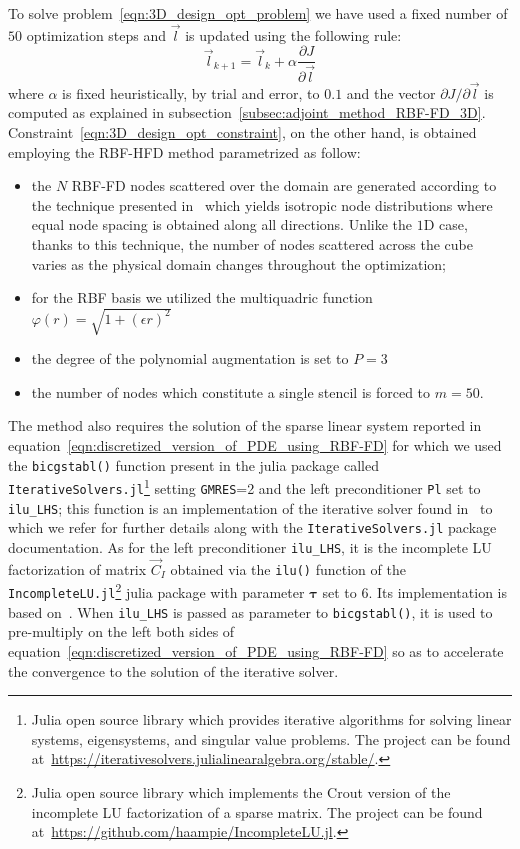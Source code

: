 \medskip
To solve problem~\eqref{eqn:3D_design_opt_problem} we have used a fixed number of $50$ optimization steps and $\vec{l}$ is updated using the following rule:
\begin{equation}
	\vec{l}_{k+1} = \vec{l}_k + \alpha \frac{\partial J}{\partial \vec{l}}
\end{equation}
where $\alpha$ is fixed heuristically, by trial and error, to $0.1$ and the vector $\partial J / \partial \vec{l}$ is computed as explained in subsection~\ref{subsec:adjoint_method_RBF-FD_3D}.
Constraint~\eqref{eqn:3D_design_opt_constraint}, on the other hand, is obtained employing the RBF-HFD method parametrized as follow:
\begin{itemize}
	\item the $N$ RBF-FD nodes scattered over the domain are generated according to the technique presented in~\cite{Zamolo:phd_thesis} which yields isotropic node distributions where equal node spacing is obtained along all directions. Unlike the $1$D case, thanks to this technique, the number of nodes scattered across the cube varies as the physical domain changes throughout the optimization;
	\item for the RBF basis we utilized the multiquadric function $\varphi(r) = \sqrt{1 + (\epsilon r)^2}$
	\item the degree of the polynomial augmentation is set to $P = 3$
	\item the number of nodes which constitute a single stencil is forced to $m = 50$.  %
\end{itemize}
The method also requires the solution of the sparse linear system reported in equation~\eqref{eqn:discretized_version_of_PDE_using_RBF-FD} for which we used the \verb|bicgstabl()| function present in the julia package called \verb|IterativeSolvers.jl|\footnote{Julia open source library which provides iterative algorithms for solving linear systems, eigensystems, and singular value problems. The project can be found at~\url{https://iterativesolvers.julialinearalgebra.org/stable/}.} setting \verb|GMRES|=2 and the left preconditioner \verb|Pl| set to \verb|ilu_LHS|; this function is an implementation of the iterative solver found in~\cite{Sleijpen:bicgstabl_paper} to which we refer for further details along with the \verb|IterativeSolvers.jl| package documentation.
As for the left preconditioner \verb|ilu_LHS|, it is the incomplete LU factorization of matrix $\vec{C}_I$ obtained via the \verb|ilu()| function of the \verb|IncompleteLU.jl|\footnote{Julia open source library which implements the Crout version of the incomplete LU factorization of a sparse matrix. The project can be found at~\url{https://github.com/haampie/IncompleteLU.jl}.} julia package with parameter $\boldsymbol{\tau}$ set to $6$. Its implementation is based on~\cite{NaLi:crout_ilu_paper}.
When \verb|ilu_LHS| is passed as parameter to \verb|bicgstabl()|, it is used to pre-multiply on the left both sides of equation~\eqref{eqn:discretized_version_of_PDE_using_RBF-FD} so as to accelerate the convergence to the solution of the iterative solver.

